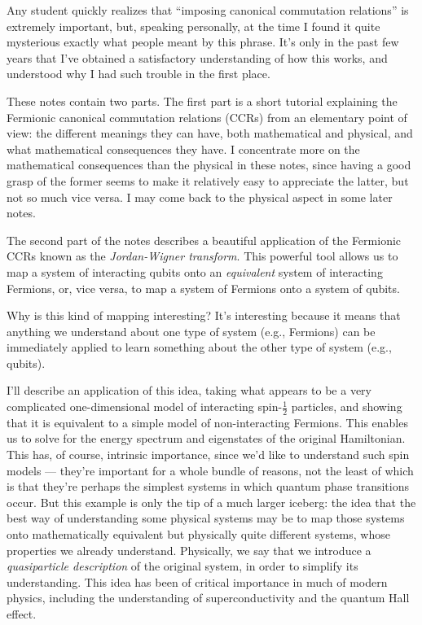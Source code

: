\documentclass[12pt]{article}
\begin{document}
{Any student quickly realizes that ``imposing canonical commutation
relations'' is extremely important, but, speaking personally, at the
time I found it quite mysterious exactly what people meant by this
phrase.  It's only in the past few years that I've obtained a
satisfactory understanding of how this works, and understood why I had
such trouble in the first place.

These notes contain two parts.  The first part is a short tutorial
explaining the Fermionic canonical commutation relations (CCRs) from
an elementary point of view: the different meanings they can have,
both mathematical and physical, and what mathematical consequences
they have.  I concentrate more on the mathematical consequences than
the physical in these notes, since having a good grasp of the former
seems to make it relatively easy to appreciate the latter, but not so
much vice versa.  I may come back to the physical aspect in some later
notes.

The second part of the notes describes a beautiful application of the
Fermionic CCRs known as the \emph{Jordan-Wigner transform}.  This
powerful tool allows us to map a system of interacting qubits onto an
\emph{equivalent} system of interacting Fermions, or, vice versa, to
map a system of Fermions onto a system of qubits.

Why is this kind of mapping interesting?  It's interesting because it
means that anything we understand about one type of system (e.g.,
Fermions) can be immediately applied to learn something about the
other type of system (e.g., qubits).

I'll describe an application of this idea, taking what appears to be a
very complicated one-dimensional model of interacting spin-$\frac 12$
particles, and showing that it is equivalent to a simple model of
non-interacting Fermions.  This enables us to solve for the energy
spectrum and eigenstates of the original Hamiltonian.  This has, of
course, intrinsic importance, since we'd like to understand such spin
models --- they're important for a whole bundle of reasons, not the
least of which is that they're perhaps the simplest systems in which
quantum phase transitions occur.  But this example is only the tip of
a much larger iceberg: the idea that the best way of understanding
some physical systems may be to map those systems onto mathematically
equivalent but physically quite different systems, whose properties we
already understand.  Physically, we say that we introduce a
\emph{quasiparticle description} of the original system, in order to
simplify its understanding.  This idea has been of critical importance
in much of modern physics, including the understanding of
superconductivity and the quantum Hall effect.

}
\end{document}
